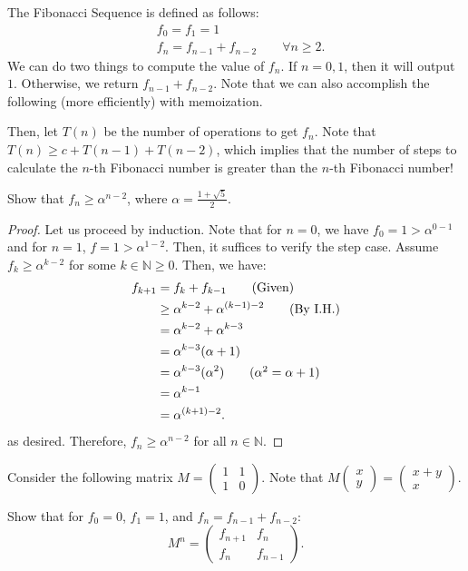 
\begin{eg}
	The Fibonacci Sequence is defined as follows:
	\begin{align*}
		&f_{0}=f_{1}=1 \\
		&f_n=f_{n-1}+f_{n-2} \qquad \forall n\ge 2
	.\end{align*}
	We can do two things to compute the value of \( f_n \). If \( n=0,1 \), then it will output \( 1 \). Otherwise, we return \( f_{n-1}+f_{n-2} \). Note that we can also accomplish the following (more efficiently) with memoization.

	Then, let \( T(n) \) be the number of operations to get \( f_n \). Note that \( T(n) \ge  c+ T(n-1) + T(n-2) \), which implies that the number of steps to calculate the \( n \)-th Fibonacci number is greater than the \( n \)-th Fibonacci number!

	Show that \( f_n \ge \alpha ^{n-2}  \), where \( \alpha =\frac{1+\sqrt{5} }{2} \).
\end{eg}

\begin{proof}
	Let us proceed by induction. Note that for \( n=0 \), we have \( f_{0}=1>\alpha ^{0-1} \) and for \( n=1 \), \( f=1>\alpha ^{1-2}  \). Then, it suffices to verify the step case. Assume \( f_k \ge \alpha ^{k-2}  \) for some \( k \in \mathbb{N} \ge 0 \). Then, we have:
	\begin{align*}
		f_{k+1}&=f_k+f_{k-1} \tag{Given} \\
					 &\ge \alpha ^{k-2}+\alpha ^{(k-1)-2}   \tag{By I.H.} \\
					 &=\alpha ^{k-2} + \alpha ^{k-3} \\
					 &=\alpha ^{k-3}(\alpha +1) \\
						&=\alpha ^{k-3}(\alpha ^{2}) \tag{\(\alpha ^{2}=\alpha +1\)} \\
						&=\alpha ^{k-1} \\
						&=\alpha ^{(k+1)-2} 
	.\end{align*}
	as desired. Therefore, \( f_n \ge \alpha ^{n-2}  \) for all \( n \in \mathbb{N} \).
\end{proof}

\begin{eg}
	Consider the following matrix \( M = \begin{pmatrix} 1 & 1 \\ 1 & 0 \end{pmatrix}  \). Note that \( M\begin{pmatrix} x \\ y \end{pmatrix} =\begin{pmatrix} x + y \\ x \end{pmatrix}  \).

	Show that for \( f_{0}=0\), \(f_{1}=1 \), and \( f_n=f_{n-1}+f_{n-2} \): \[
		M^n = \begin{pmatrix} f_{n+1} & f_n \\ f_n & f_{n-1} \end{pmatrix} 
	.\] 
\end{eg}

